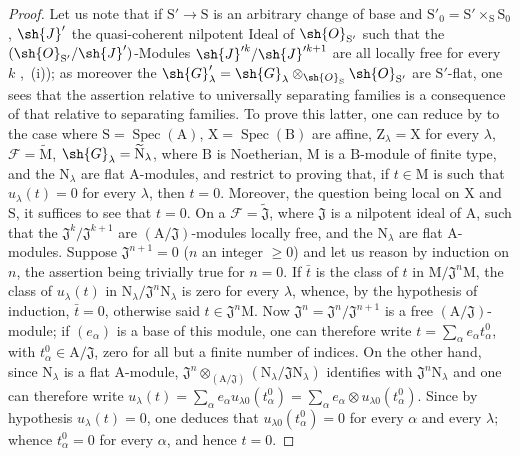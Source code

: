 \begin{proof}
Let us note that if $\mathrm{S}'\to\mathrm{S}$ is an arbitrary change of base and $\mathrm{S}'_0=\mathrm{S}'\times_\mathrm{S}\mathrm{S}_0$, $\sh{J}'$ the quasi-coherent nilpotent Ideal of $\sh{O}_{\mathrm{S}'}$ such that the $(\sh{O}_{\mathrm{S}'}/\sh{J}')$-Modules $\sh{J}'^k/\sh{J}'^{k+1}$ are all locally free for every $k$ ,~(i)); as moreover the $\sh{G}'_\lambda=\sh{G}_\lambda\otimes_{\sh{O}_\mathrm{S}}\sh{O}_{\mathrm{S}'}$ are $\mathrm{S}'$-flat, one sees that the assertion relative to universally separating families is a consequence of that relative to separating families.
To prove this latter, one can reduce by  to the case where $\mathrm{S}=\operatorname{Spec}(\mathrm{A})$, $\mathrm{X}=\operatorname{Spec}(\mathrm{B})$ are affine, $\mathrm{Z}_\lambda=\mathrm{X}$ for every $\lambda$, $\mathscr{F}=\widetilde{\mathrm{M}}$, $\sh{G}_\lambda=\widetilde{\mathrm{N}}_\lambda$, where $\mathrm{B}$ is Noetherian, $\mathrm{M}$ is a $\mathrm{B}$-module of finite type, and the $\mathrm{N}_\lambda$ are flat $\mathrm{A}$-modules, and restrict to proving that, if $t\in\mathrm{M}$ is such that $u_\lambda(t)=0$ for every $\lambda$, then $t=0$.
Moreover, the question being local on $\mathrm{X}$ and $\mathrm{S}$, it suffices to see that $t=0$.
On a $\mathscr{F}=\widetilde{\mathfrak{J}}$, where $\mathfrak{J}$ is a nilpotent ideal of $\mathrm{A}$, such that the $\mathfrak{J}^k/\mathfrak{J}^{k+1}$ are $(\mathrm{A}/\mathfrak{J})$-modules locally free, and the $\mathrm{N}_\lambda$ are flat $\mathrm{A}$-modules.
Suppose $\mathfrak{J}^{n+1}=0$ ($n$ an integer $\geq 0$) and let us reason by induction on $n$, the assertion being trivially true for $n=0$.
If $\bar{t}$ is the class of $t$ in $\mathrm{M}/\mathfrak{J}^n\mathrm{M}$, the class of $u_\lambda(t)$ in $\mathrm{N}_\lambda/\mathfrak{J}^n\mathrm{N}_\lambda$ is zero for every $\lambda$, whence, by the hypothesis of induction, $\bar{t}=0$, otherwise said $t\in\mathfrak{J}^n\mathrm{M}$.
Now $\mathfrak{J}^n=\mathfrak{J}^n/\mathfrak{J}^{n+1}$ is a free $(\mathrm{A}/\mathfrak{J})$-module; if $(e_\alpha)$ is a base of this module, one can therefore write $t=\sum_\alpha e_\alpha t_\alpha^0$, with $t_\alpha^0\in\mathrm{A}/\mathfrak{J}$, zero for all but a finite number of indices.
On the other hand, since $\mathrm{N}_\lambda$ is a flat $\mathrm{A}$-module, $\mathfrak{J}^n\otimes_{(\mathrm{A}/\mathfrak{J})}(\mathrm{N}_\lambda/\mathfrak{J}\mathrm{N}_\lambda)$ identifies with $\mathfrak{J}^n\mathrm{N}_\lambda$ and one can therefore write $u_\lambda(t)=\sum_\alpha e_\alpha u_{\lambda 0}(t_\alpha^0)=\sum_\alpha e_\alpha\otimes u_{\lambda 0}(t_\alpha^0)$.
Since by hypothesis $u_\lambda(t)=0$, one deduces that $u_{\lambda 0}(t_\alpha^0)=0$ for every $\alpha$ and every $\lambda$; whence $t_\alpha^0=0$ for every $\alpha$, and hence $t=0$.
\end{proof}

